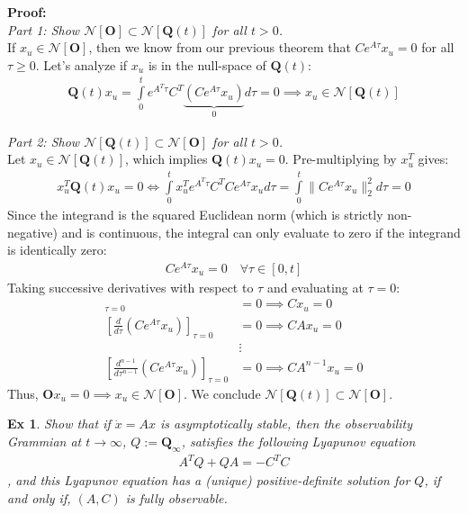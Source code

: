 \documentclass[twoside]{article}
\newtheorem{exmp}[theorem]{Ex}
\begin{document}
\textbf{Proof:} \\
\textit{Part 1: Show $\mathcal{N}[ \mathbf{O} ] \subset \mathcal{N}[ \mathbf{Q}(t) ]$ for all $t > 0$.}\\ 
If $x_u \in \mathcal{N}[ \mathbf{O} ]$, then we know from our previous theorem that $C e^{A \tau} x_u = 0$ for all $\tau \ge 0$. 
Let's analyze if $x_u$ is in the null-space of $\mathbf{Q}(t)$:
%
\begin{align*}
    \mathbf{Q}(t) x_u = \int\limits_{0}^{t} e^{A^T \tau} C^T \underbrace{(C e^{A \tau} x_u)}_{0} d \tau
    = 0 \implies x_u \in \mathcal{N}[ \mathbf{Q}(t) ]
\end{align*}
%

\textit{Part 2: Show $\mathcal{N}[ \mathbf{Q}(t) ] \subset \mathcal{N}[ \mathbf{O} ]$ for all $t > 0$.}\\
Let $x_u \in \mathcal{N}[ \mathbf{Q}(t) ]$, which implies $\mathbf{Q}(t) x_u = 0$. Pre-multiplying by $x_u^T$ gives:
\begin{align*}
    x_u^T \mathbf{Q}(t) x_u = 0 \iff \int\limits_{0}^{t} x_u^T e^{A^T \tau} C^T C e^{A \tau} x_u d \tau = \int\limits_{0}^{t} \| C e^{A \tau} x_u \|_2^2 d \tau = 0
\end{align*}
%
Since the integrand is the squared Euclidean norm (which is strictly non-negative) and is continuous, the integral can only evaluate to zero if the integrand is identically zero:
%
\begin{align*}
  C e^{A \tau} x_u = 0 \quad \forall \tau \in [0 , t]
\end{align*}
Taking successive derivatives with respect to $\tau$ and evaluating at $\tau = 0$:
\begin{align*}
  [ C e^{A \tau} x_u]_{\tau = 0} &= 0 \implies C x_u = 0 \\
  \left[\frac{d}{d\tau}( C e^{A \tau} x_u )\right]_{\tau = 0} &= 0 \implies C A x_u = 0 \\
  &\vdots \\
  \left[\frac{d^{n-1}}{d\tau^{n-1}}( C e^{A \tau} x_u )\right]_{\tau = 0} &= 0 \implies C A^{n-1} x_u = 0
\end{align*}
Thus, $\mathbf{O} x_u = 0 \implies x_u \in \mathcal{N}[ \mathbf{O} ]$. We conclude $\mathcal{N}[ \mathbf{Q}(t) ] \subset \mathcal{N}[ \mathbf{O} ]$.

\begin{exmp}
Show that if $\dot{x} = A x$ is asymptotically stable, then the observability Grammian at $t \to \infty$, $Q := \mathbf{Q}_{\infty}$,
satisfies the following Lyapunov equation
%
\begin{align*}
    A^T Q + Q A = - C^T C
\end{align*}
% 
, and this Lyapunov equation has a (unique) positive-definite solution for $Q$,
if and only if, $(A,C)$ is fully observable.
\end{exmp}
\end{document}
